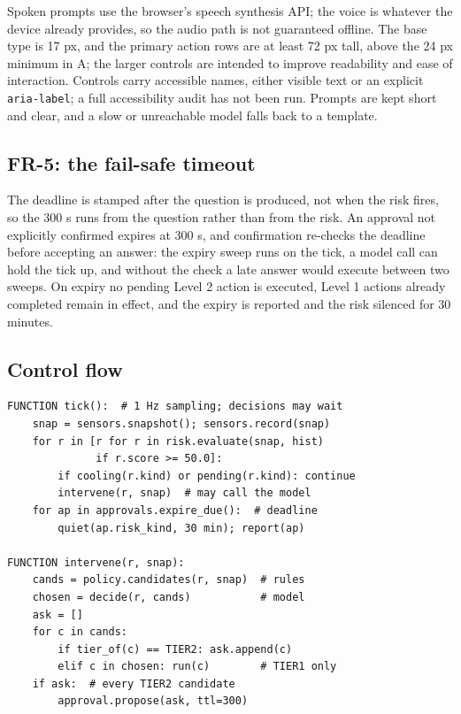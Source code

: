 \documentclass[conference]{IEEEtran}
\begin{document}
Spoken prompts use the browser's speech synthesis API; the voice is whatever the device already provides, so the audio path is not guaranteed offline. The base type is 17 px, and the primary action rows are at least 72 px tall, above the 24 px minimum in A; the larger controls are intended to improve readability and ease of interaction. Controls carry accessible names, either visible text or an explicit \texttt{aria-label}; a full accessibility audit has not been run. Prompts are kept short and clear, and a slow or unreachable model falls back to a template.

\subsection{FR-5: the fail-safe timeout}

The deadline is stamped after the question is produced, not when the risk fires, so the 300 s runs from the question rather than from the risk. An approval not explicitly confirmed expires at 300 s, and confirmation re-checks the deadline before accepting an answer: the expiry sweep runs on the tick, a model call can hold the tick up, and without the check a late answer would execute between two sweeps. On expiry no pending Level 2 action is executed, Level 1 actions already completed remain in effect, and the expiry is reported and the risk silenced for 30 minutes.

\subsection{Control flow}

\begin{lstlisting}
FUNCTION tick():  # 1 Hz sampling; decisions may wait
    snap = sensors.snapshot(); sensors.record(snap)
    for r in [r for r in risk.evaluate(snap, hist)
              if r.score >= 50.0]:
        if cooling(r.kind) or pending(r.kind): continue
        intervene(r, snap)  # may call the model
    for ap in approvals.expire_due():  # deadline
        quiet(ap.risk_kind, 30 min); report(ap)

FUNCTION intervene(r, snap):
    cands = policy.candidates(r, snap)  # rules
    chosen = decide(r, cands)           # model
    ask = []
    for c in cands:
        if tier_of(c) == TIER2: ask.append(c)
        elif c in chosen: run(c)        # TIER1 only
    if ask:  # every TIER2 candidate
        approval.propose(ask, ttl=300)
\end{lstlisting}
\end{document}
